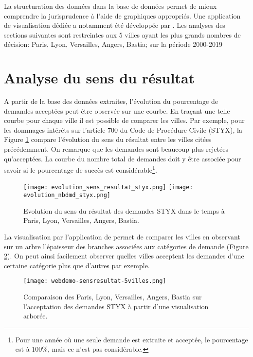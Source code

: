La structuration des données dans la base de données permet de mieux comprendre la jurisprudence à l'aide de graphiques appropriés. Une application de visualisation dédiée a notamment été développée  par \citet{PRYSIAZHNIUK2017jurisprudence-demo-web}.
Les analyses des sections suivantes sont restreintes aux 5 villes ayant les plus grands nombres de décision: Paris, Lyon, Versailles, Angers, Bastia; sur la période 2000-2019

\section{Analyse du sens du résultat}
A partir de la base des données extraites, l'évolution du pourcentage de demandes acceptées  peut être observée sur une courbe. En traçant une telle courbe pour chaque ville il est possible de comparer les villes.
Par exemple, pour les dommages intérêts sur l'article 700 du Code de Procédure Civile (STYX), la Figure \ref{fig:demo:analyse-sens-resultat-styx} compare l'évolution du sens du résultat entre les villes citées précédemment. On remarque que les demandes sont beaucoup plus rejetées qu'acceptées. La courbe du nombre total de demandes doit y être associée pour savoir si le pourcentage de succès est considérable\footnote{Pour une année où une seule demande est extraite et acceptée, le pourcentage est à 100\%, mais ce n'est pas considérable.}.

\begin{figure}[!htb]
	\centering 
	\texttt{[image: evolution\_sens\_resultat\_styx.png]}
	\texttt{[image: evolution\_nbdmd\_styx.png]}
	\caption{Evolution du sens du résultat des demandes STYX dans le temps à Paris, Lyon, Versailles, Angers, Bastia.}\label{fig:demo:analyse-sens-resultat-styx}
\end{figure}

La visualisation par l'application de \citet{PRYSIAZHNIUK2017jurisprudence-demo-web} permet de comparer les villes en observant sur un arbre l'épaisseur des branches associées aux catégories de demande (Figure \ref{fig:demo:web-styx}). On peut ainsi facilement observer quelles villes acceptent les demandes d'une certaine catégorie plus que d'autres par exemple.


\begin{figure}[!htb]
	\centering 
	\texttt{[image: webdemo-sensresultat-5villes.png]}
	\caption{Comparaison des Paris, Lyon, Versailles, Angers, Bastia sur l'acceptation des demandes STYX à partir d'une visualisation arborée.}\label{fig:demo:web-styx}
\end{figure}


